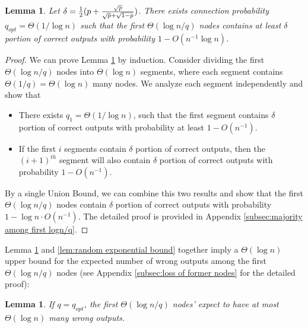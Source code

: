 \documentclass[a4paper,UKenglish]{lipics}
\newtheorem{lem}[thm]{Lemma}
\theoremstyle{definition}
\begin{document}
\begin{lem}
\label{lem:majority among first logn/q}
Let $\delta = {1\over 2}(p + {\sqrt{p}\over \sqrt{p} + \sqrt{1-p}})$.
There exists connection probability $q_{opt} = \Theta(1/\log n)$ such that the first $\Theta(\log n/q)$ nodes 
	contains at least $\delta$ portion of correct outputs with probability $1 - O(n^{-1}\log n)$.
\end{lem}

\begin{proof}
We can prove Lemma \ref{lem:majority among first logn/q} by induction.
Consider dividing the first $\Theta(\log n/q)$ nodes into $\Theta(\log n)$ segments, 
	where each segment contains $\Theta(1/q) = \Theta(\log n)$ many nodes.
We analyze each segment independently and show that 
\begin{itemize}
\item There exists $q_1 = \Theta(1/\log n)$, 
		such that the first segment contains $\delta$ portion of correct outputs with probability at least $1 - O(n^{-1})$.
\item If the first $i$ segments contain $\delta$ portion of correct outputs,
		then the $(i+1)^{th}$ segment will also contain $\delta$ portion of correct outputs with probability $1 - O(n^{-1})$.
\end{itemize}
By a single Union Bound, we can combine this two results and show that
	the first $\Theta(\log n/q)$ nodes contain $\delta$ portion of correct outputs with probability $1 - \log n\cdot O(n^{-1})$.
The detailed proof is provided in Appendix \ref{subsec:majority among first logn/q}.
\end{proof}

Lemma \ref{lem:majority among first logn/q} and \ref{lem:random exponential bound} together imply a $\Theta(\log n)$ upper bound for the expected number of wrong outputs among the first $\Theta(\log n / q)$ nodes (see Appendix \ref{subsec:loss of former nodes} for the detailed proof):
\begin{lem}
\label{lem:loss of former nodes}
If $q = q_{opt}$, the first $\Theta(\log n/q)$ nodes' expect to have at most $\Theta(\log n)$ many wrong outputs.
\end{lem}
\end{document}
